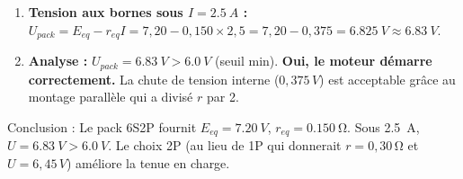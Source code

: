 \documentclass[11pt]{article}
\newcommand{\cle}[1]{{\popxbold\color{popdark}#1}}
\begin{document}
\begin{exoresolu}
\begin{enumerate}
    $E_{eq} = E_{branche} = \SI{7,20}{V}$.
    $\frac{1}{r_{eq}} = \frac{1}{r_{branche}} + \frac{1}{r_{branche}} = \frac{2}{0,300} \Rightarrow r_{eq} = \frac{0,300}{2} = \SI{0,150}{\ohm}$.
    \item \textbf{Tension aux bornes sous $I = \SI{2,5}{A}$ :}
    $U_{pack} = E_{eq} - r_{eq} I = 7,20 - 0,150 \times 2,5 = 7,20 - 0,375 = \SI{6,825}{V} \approx \SI{6,83}{V}$.
    \item \textbf{Analyse :} $U_{pack} = \SI{6,83}{V} > \SI{6,0}{V}$ (seuil min).
    \textbf{Oui, le moteur démarre correctement.} La chute de tension interne ($0,375\,\si{V}$) est acceptable grâce au montage parallèle qui a divisé $r$ par 2.
\end{enumerate}
\cle{Conclusion} : Le pack 6S2P fournit $E_{eq}=\SI{7,20}{V}$, $r_{eq}=\SI{0,150}{\ohm}$. Sous \SI{2,5}{A}, $U=\SI{6,83}{V} > \SI{6,0}{V}$. Le choix 2P (au lieu de 1P qui donnerait $r=0,30\,\si{\ohm}$ et $U=6,45\,\si{V}$) améliore la tenue en charge.
\end{exoresolu}
\end{document}
